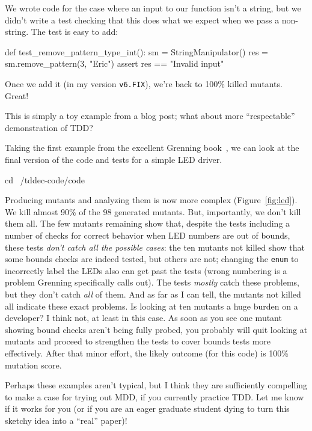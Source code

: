 \documentclass[sigplan,screen]{acmart}
\begin{document}
 We wrote code for the case where an input to our function isn't a
 string, but we didn't write a test checking that this does what we
 expect when we pass a non-string.  The test is easy to add:

 \begin{code}
def test\_remove\_pattern\_type\_int():
     sm = StringManipulator()
     res = sm.remove\_pattern(3, "Eric")
     assert res == "Invalid input"
   \end{code}

   Once we add it (in my version {\tt v6.FIX}), we're back to 100\%
   killed mutants.  Great!

   This is simply a toy example from a blog post; what about more
   ``respectable'' demonstration of TDD?

   Taking the first example from the excellent Grenning
   book~\cite{grenning}, we can look at the final version of the code
   and tests for a simple LED driver.

\begin{code}
cd ~/tddec-code/code
\end{code}

Producing mutants and analyzing them is now more complex
(Figure~\ref{fig:led}).  We kill almost 90\% of the 98 generated
mutants.  But, importantly, we don't kill them all.  The few mutants
remaining show that, despite the tests including a number of checks
for correct behavior when LED numbers are out of bounds, these tests
\emph{don't catch all the possible cases}:  the ten mutants not killed
show that some bounds checks are indeed tested, but others are not;
changing the {\tt enum} to incorrectly label the LEDs also can get
past the tests (wrong numbering is a problem Grenning specifically
calls out).  The tests \emph{mostly} catch these problems, but they
don't catch \emph{all} of them.  And as far as I can tell, the mutants
not killed all indicate these exact problems.  Is looking at ten
mutants a huge burden on a developer?  I think not, at least in this
case.  As soon as you see one mutant showing bound checks aren't being
fully probed, you probably will quit looking at mutants and proceed to
strengthen the tests to cover bounds tests more effectively.  After
that minor effort, the likely outcome (for this code) is 100\%
mutation score.

Perhaps these examples aren't typical, but I think they are
sufficiently compelling to make a case for trying out MDD, if you
currently practice TDD.  Let me know if it works for you (or if you
are an eager graduate student dying to turn this sketchy idea into a ``real'' paper)!
\end{document}
